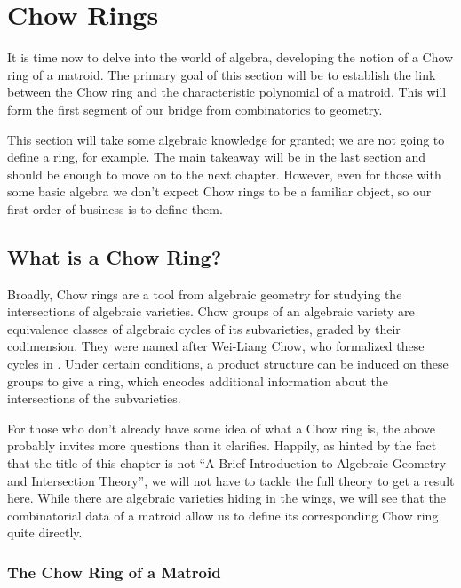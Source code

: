 \documentclass[12pt,oneside]{../../sfsuthesis}
\begin{document}
\chapter{Chow Rings}

It is time now to delve into the world of algebra, developing the notion of a Chow ring of a matroid.
The primary goal of this section will be to establish the link between the Chow ring and the characteristic polynomial of a matroid.
This will form the first segment of our bridge from combinatorics to geometry.

This section will take some algebraic knowledge for granted; we are not going to define a ring, for example.
The main takeaway will be in the last section and should be enough to move on to the next chapter.
However, even for those with some basic algebra we don't expect Chow rings to be a familiar object, so our first order of business is to define them.

\section{What is a Chow Ring?}

Broadly, Chow rings are a tool from algebraic geometry for studying the intersections of algebraic varieties.
Chow groups of an algebraic variety are equivalence classes of algebraic cycles of its subvarieties, graded by their codimension.
They were named after Wei-Liang Chow, who formalized these cycles in \cite{chowEquivalenceClassesCycles1956}.
Under certain conditions, a product structure can be induced on these groups to give a ring, which encodes additional information about the intersections of the subvarieties.

For those who don't already have some idea of what a Chow ring is, the above probably invites more questions than it clarifies.
Happily, as hinted by the fact that the title of this chapter is not ``A Brief Introduction to Algebraic Geometry and Intersection Theory'', we will not have to tackle the full theory to get a result here.
While there are algebraic varieties hiding in the wings, we will see that the combinatorial data of a matroid allow us to define its corresponding Chow ring quite directly.

\subsection{The Chow Ring of a Matroid}
\end{document}

